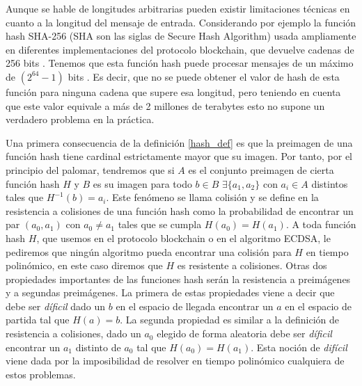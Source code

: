 Aunque se hable de longitudes arbitrarias pueden existir limitaciones técnicas en cuanto a la longitud del mensaje de entrada. Considerando por ejemplo la función hash SHA-256 (SHA son las siglas de Secure Hash Algorithm) usada ampliamente en diferentes implementaciones del protocolo blockchain, que devuelve cadenas de 256 bits \citep{sha256_2}. Tenemos que esta función hash puede procesar mensajes de un máximo de $(2^{64} -1)$ bits \citep{sha256}. Es decir, que no se puede obtener el valor de hash de esta función para ninguna cadena que supere esa longitud, pero teniendo en cuenta que este valor equivale a más de 2 millones de terabytes esto no supone un verdadero problema en la práctica.

Una primera consecuencia de la definición \ref{hash_def} es que la preimagen de una función hash tiene cardinal estrictamente mayor que su imagen. Por tanto, por el principio del palomar, tendremos que si $A$ es el conjunto preimagen de cierta función hash $H$ y $B$ es su imagen para todo $b \in B$  $\exists \{a_{1},a_{2}\}$ con $a_{i} \in A$ distintos tales que $H^{-1}(b) = a_i$. Este fenómeno se llama colisión y se define en la resistencia a colisiones de una función hash como la probabilidad de encontrar un par $(a_{0},a_{1})$ con $a_{0} \not= a_{1}$ tales que se cumpla  $H(a_{0}) = H(a_{1})$. A toda función hash $H$, que usemos en el protocolo blockchain o en el algoritmo ECDSA, le pediremos que ningún algoritmo pueda encontrar una colisión para $H$ en tiempo polinómico, en este caso diremos que $H$ es resistente a colisiones. Otras dos propiedades importantes de las funciones hash serán la resistencia a preimágenes y a segundas preimágenes. La primera de estas propiedades viene a decir que debe ser \textit{díficil} dado un $b$ en el espacio de llegada encontrar un $a$ en el espacio de partida tal que $H(a) = b$. La segunda propiedad es similar a la definición de resistencia a colisiones, dado un $a_{0}$ elegido de forma aleatoria debe ser \textit{díficil} encontrar un $a_{1}$ distinto de $a_{0}$ tal que $H(a_{0}) = H(a_{1})$. Esta noción de \textit{difícil} viene dada por la imposibilidad de resolver en tiempo polinómico cualquiera de estos problemas.

